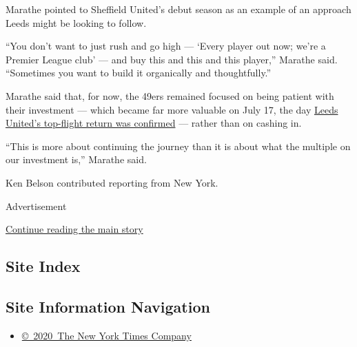 Marathe pointed to Sheffield United's debut season as an example of an
approach Leeds might be looking to follow.

``You don't want to just rush and go high --- `Every player out now;
we're a Premier League club' --- and buy this and this and this
player,'' Marathe said. ``Sometimes you want to build it organically and
thoughtfully.''

Marathe said that, for now, the 49ers remained focused on being patient
with their investment --- which became far more valuable on July 17, the
day
\href{https://www.nytimes3xbfgragh.onion/2020/07/18/sports/soccer/leeds-united-premier-league.html}{Leeds
United's top-flight return was confirmed} --- rather than on cashing in.

``This is more about continuing the journey than it is about what the
multiple on our investment is,'' Marathe said.

Ken Belson contributed reporting from New York.

Advertisement

\protect\hyperlink{after-bottom}{Continue reading the main story}

\hypertarget{site-index}{%
\subsection{Site Index}\label{site-index}}

\hypertarget{site-information-navigation}{%
\subsection{Site Information
Navigation}\label{site-information-navigation}}

\begin{itemize}
\tightlist
\item
  \href{https://help.nytimes3xbfgragh.onion/hc/en-us/articles/115014792127-Copyright-notice}{©~2020~The
  New York Times Company}
\end{itemize}

